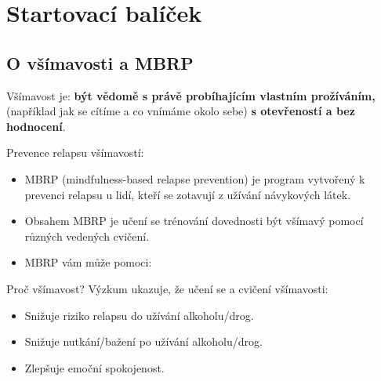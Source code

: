 
\bgroup
	\setcounter{section}{-1}
	\titleformat{\section}[frame]{}{}{1em}{\Large\scshape\bfseries}
	\section{Startovací balíček}
\egroup	



\subsection{O všímavosti a MBRP}
	Všímavost je: \textbf{být vědomě s právě probíhajícím vlastním prožíváním,} (například jak se cítíme a co vnímáme okolo sebe) \textbf{s otevřeností a bez hodnocení}.

	Prevence relapsu všímavostí:
	\begin{itemize}
		\item MBRP (mindfulness-based relapse prevention) je program vytvořený k prevenci relapsu u lidí, kteří se zotavují z užívání návykových látek.
		\item Obsahem MBRP je učení se trénování dovednosti být všímavý pomocí různých vedených cvičení.
		\item MBRP vám může pomoci:
	\end{itemize}
	Proč všímavost? Výzkum ukazuje, že učení se a cvičení všímavosti:
	\begin{itemize}
		\item[\mbrpIcon{trend-down}] Snižuje riziko relapsu do užívání alkoholu/drog.
		\item[\mbrpIcon{trend-down}] Snižuje nutkání/bažení po užívání alkoholu/drog.
		\item[\mbrpIcon{trend-up}] Zlepšuje emoční spokojenost.
	\end{itemize}
